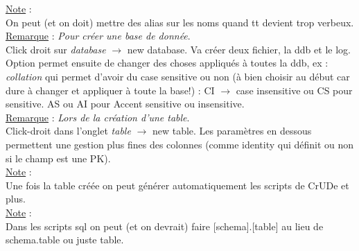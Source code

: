 \documentclass[a4paper,12pt,twoside]{article}
\newcommand{\rem}[2]{\noindent\underline{Remarque} : \textit{#1}.\\ \indent #2}
\newcommand{\note}[1]{\noindent\underline{Note} : \\ \indent #1}
\begin{document}
\note{On peut (et on doit) mettre des alias sur les noms quand tt devient trop verbeux.}\\

\rem{Pour créer une base de donnée}{Click droit sur \textit{database} $\to$ {new database}. Va créer deux fichier, la ddb et le log. Option permet ensuite de changer des choses appliqués à toutes la ddb, ex : \textit{collation} qui permet d'avoir du case sensitive ou non (à bien choisir au début car dure à changer et appliquer à toute la base!) : CI $\to$ case insensitive ou CS pour sensitive. AS ou AI pour Accent sensitive ou insensitive.}\\

\rem{Lors de la création d'une table}{Click-droit dans l'onglet \textit{table} $\to$ {new table}. Les paramètres en dessous permettent une gestion plus fines des colonnes (comme identity qui définit ou non si le champ est une PK).}\\

\note{Une fois la table créée on peut générer automatiquement les scripts de CrUDe et plus. }\\

\note{Dans les scripts sql on peut (et on devrait) faire [schema].[table] au lieu de schema.table ou juste table.}\\

\newpage
\printglossary[type=\acronymtype]%
\glsaddallunused %
\printglossary[type = main,nonumberlist]%
\end{document}
